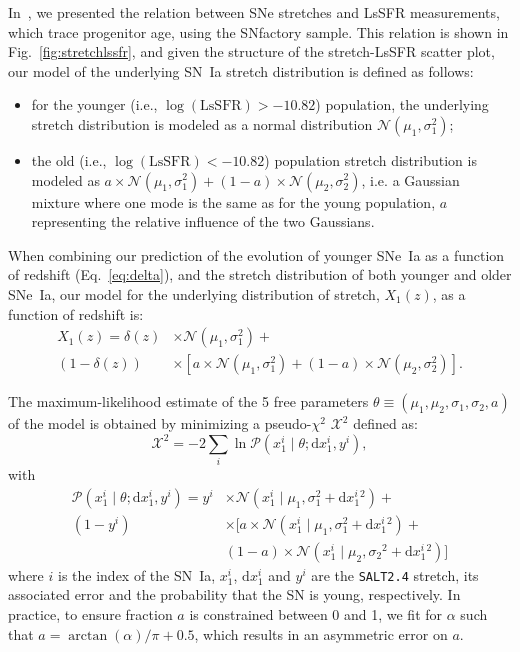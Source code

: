 \documentclass[]{aa} %
\newcommand{\prob}[2]{\mathcal{P}\left( #1 \mid #2\right)}
\begin{document}
In~\cite{rigault2018}, we presented the relation between SNe stretches and LsSFR
measurements, which trace progenitor age, using the SNfactory sample. This
relation is shown in Fig.~\ref{fig:stretchlssfr}, and given the structure of the
stretch-LsSFR scatter plot, our model of the underlying SN~Ia stretch
distribution is defined as follows:
\begin{itemize}
    \item for the younger (i.e., $\log( \mathrm{LsSFR})>-10.82$) population, the
        underlying stretch distribution is modeled as a normal distribution
        $\mathcal{N}(\mu_1, \sigma_1^2)$; 
    \item the old (i.e., $\log( \mathrm{LsSFR})<-10.82$) population stretch
        distribution is modeled as $a\times \mathcal{N}(\mu_1, \sigma_1^2) +
        (1-a)\times \mathcal{N}(\mu_2, \sigma_2^2)$, i.e. a Gaussian mixture
        where one mode is the same as for the young population, $a$
        representing the relative influence of the two Gaussians.
\end{itemize}
When combining our prediction of the evolution of younger SNe~Ia as a function
of redshift (Eq.~\ref{eq:delta}), and the stretch distribution of both younger
and older SNe~Ia, our model for the underlying distribution of stretch,
$X_1(z)$, as a function of redshift is:
\begin{align}
    \label{eq:stretchz}
    X_1(z) = {}
    \delta(z) &\times \mathcal{N}(\mu_1,\sigma_1^2) + {}\nonumber\\
    (1 - \delta(z)) &\times \left[a\times\mathcal{N}(\mu_1,\sigma_1^2) +
    (1-a)\times\mathcal{N}(\mu_2,\sigma_2^2)\right].
\end{align}

The maximum-likelihood estimate of the 5 free parameters
$\theta\equiv({\mu_1,\mu_2,\sigma_1,\sigma_2,a})$ of the model is obtained by
minimizing a pseudo-$\chi^2$ $\mathcal{X}^2$ defined as:
\begin{equation}
    \label{eq:likelihood}
    \mathcal{X}^2 = -2 \sum_i \ln \prob{x^{i}_{1}}{\theta;
    \mathrm{d}x^{i}_{1}, y^i},
\end{equation}
with
\begin{align}
    \label{eq:likelihoodsnf}
    \prob{x^{i}_{1}}{\theta; \mathrm{d}x^{i}_{1}, y^i} =
    y^i &\times \mathcal{N}\left(x^{i}_{1} \mid \mu_1, \sigma_{1}^{2}+\mathrm{d}x^{i}_{1}{}^{2}\right) + {} \nonumber\\
        (1-y^i) &\times \bigg[
        a \times \mathcal{N}\left(x^{i}_{1} \mid \mu_1,
        \sigma_{1}^{2}+\mathrm{d}x^{i}_{1}{}^{2}\right) + {} \nonumber\\
     &(1-a) \times \mathcal{N}\left(x^{i}_{1} \mid \mu_2,
     \sigma_2{}^{2}+\mathrm{d}x^{i}_{1}{}^{2}\right) \bigg]
\end{align}
where $i$ is the index of the SN~Ia, $x^{i}_{1}$, $\mathrm{d}x^{i}_{1}$ and
$y^i$ are the \textsc{\texttt{SALT2.4}} stretch, its associated error and the
probability that the SN is young, respectively.  In practice, to ensure fraction
$a$ is constrained between 0 and 1, we fit for $\alpha$ such that
$a=\arctan(\alpha)/\pi+0.5$, which results in an asymmetric error on $a$.
\end{document}
